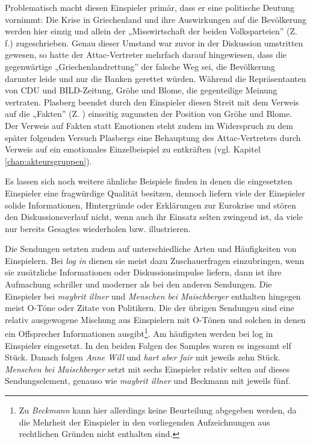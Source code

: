Problematisch macht diesen Einspieler primär, dass er eine politische Deutung vornimmt: Die Krise in Griechenland und ihre Auswirkungen auf die Bevölkerung werden hier einzig und allein der „Misswirtschaft der beiden Volksparteien” (Z. f.) zugeschrieben. Genau dieser Umstand war zuvor in der Diskussion umstritten gewesen, so hatte der Attac-Vertreter mehrfach darauf hingewiesen, dass die gegenwärtige „Griechenlandrettung” der falsche Weg sei, die Bevölkerung darunter leide und nur die Banken gerettet würden. Während die Repräsentanten von CDU und BILD-Zeitung, Gröhe und Blome, die gegenteilige Meinung vertraten. Plasberg beendet durch den Einspieler diesen Streit mit dem Verweis auf die „Fakten” (Z. ) einseitig zugunsten der Position von Gröhe und Blome. Der Verweis auf Fakten statt Emotionen steht zudem im Widerspruch zu dem später folgenden Versuch Plasbergs eine Behauptung des Attac-Vertreters durch Verweis auf ein emotionales Einzelbeispiel zu entkräften (vgl. Kapitel \vref{chap:akteursgruppen}).

Es lassen sich noch weitere ähnliche Beispiele finden in denen die eingesetzten Einspieler eine fragwürdige Qualität besitzen, dennoch liefern viele der Einspieler solide Informationen, Hintergründe oder Erklärungen zur Eurokrise und stören den Diskussionsverlauf nicht, wenn auch ihr Einsatz selten zwingend ist, da viele nur bereits Gesagtes wiederholen bzw. illustrieren.

Die Sendungen setzten zudem auf unterschiedliche Arten und Häufigkeiten von Einspielern. Bei \textit{log in} dienen sie meist dazu Zuschauerfragen einzubringen, wenn sie zusätzliche Informationen oder Diskussionsimpulse liefern, dann ist ihre Aufmachung schriller und moderner als bei den anderen Sendungen. Die Einspieler bei \textit{maybrit illner} und \textit{Menschen bei Maischberger} enthalten hingegen meist O-Töne oder Zitate von Politikern. Die der übrigen Sendungen sind eine relativ ausgewogene Mischung aus Einspielern mit O-Tönen und solchen in denen ein Offsprecher Informationen ausgibt\footnote{Zu \textit{Beckmann} kann hier allerdings keine Beurteilung abgegeben werden, da die Mehrheit der Einspieler in den vorliegenden Aufzeichnungen aus rechtlichen Gründen nicht enthalten sind.}. Am häufigsten werden bei log in Einspieler eingesetzt. In den beiden Folgen des Samples waren es ingesamt elf Stück. Danach folgen \textit{Anne Will} und \textit{hart aber fair} mit jeweils zehn Stück. \textit{Menschen bei Maischberger} setzt mit sechs Einspieler relativ selten auf dieses Sendungselement, genauso wie \textit{maybrit illner} und Beckmann mit jeweils fünf.


